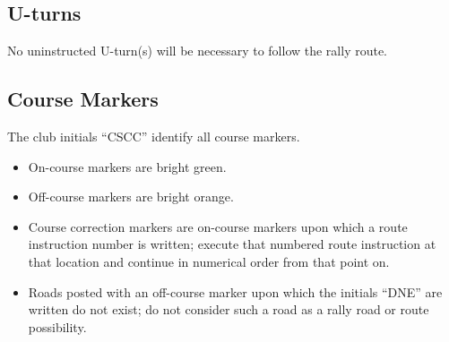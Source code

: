 \subsection{U-turns}
No uninstructed U-turn(s) will be necessary to follow the rally route.

\subsection{Course Markers}
The club initials ``CSCC'' identify all course markers.

\begin{itemize}

\item On-course markers are bright green.

\item Off-course markers are bright orange.

\item Course correction markers are on-course markers upon which a route instruction number is written; execute that numbered route instruction at that location and continue in numerical order from that point on.

\item Roads posted with an off-course marker upon which the initials ``DNE'' are written do not exist; do not consider such a road as a rally road or route possibility.

\end{itemize}